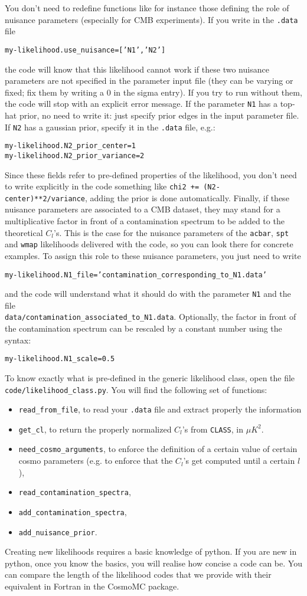 \documentclass[10pt]{article}
\newcommand{\CLASS}{\texttt{CLASS}}
\begin{document}
 You don't need to redefine functions like for instance those defining the role of nuisance parameters (especially for CMB experiments). 
 If you write in the \verb?.data? file
 \begin{alltt}
my-likelihood.use_nuisance           = ['N1','N2'] 
\end{alltt}
the code will know that this likelihood cannot work if these two nuisance parameters are not specified  in the parameter input file (they can be varying or fixed; fix them by writing a 0 in the sigma entry). If you try to run without them, the code will stop with an explicit error message.
If the parameter \verb?N1? has a top-hat prior, no need to write it: just specify prior edges in the input parameter file. If \verb?N2? has a gaussian prior, specify it in the \verb?.data? file, e.g.:
 \begin{alltt}
  my-likelihood.N2_prior_center  = 1
  my-likelihood.N2_prior_variance = 2  
\end{alltt}
Since these fields refer to pre-defined properties of the likelihood, you don't need to write explicitly in the code something like \verb?chi2 += (N2-center)**2/variance?, adding the prior is done automatically. Finally, if these nuisance parameters are associated to a CMB dataset, they may stand for a multiplicative factor in front of a contamination spectrum to be added to the theoretical $C_l$'s. This is the case for the nuisance parameters of the \verb?acbar?, \verb?spt? and \verb?wmap? likelihoods delivered with the code, so you can look there for concrete examples. To assign this role to these nuisance parameters, you just need to write
\begin{alltt}
  my-likelihood.N1_file = 'contamination_corresponding_to_N1.data'
\end{alltt}
and the code will understand what it should do with the parameter \verb?N1? and the file\\
\verb?data/contamination_associated_to_N1.data?. Optionally, the factor in front of the contamination spectrum can be rescaled by a constant number using the syntax:
\begin{alltt}
  my-likelihood.N1_scale = 0.5
\end{alltt}
To know exactly what is pre-defined in the generic likelihood class, open the file \verb?code/likelihood_class.py?. You will find the following set of functions:
  \begin{itemize}
    \item \verb?read_from_file?, to read your \verb?.data? file and extract
      properly the information
    \item \verb?get_cl?, to return the properly normalized $C_l$'s from \CLASS, in $\mu K^2$.
    \item \verb?need_cosmo_arguments?, to enforce the definition of a certain
      value of certain cosmo parameters (e.g. to enforce that the
      $C_l$'s get computed until a certain $l$),
    \item \verb?read_contamination_spectra?, 
    \item \verb?add_contamination_spectra?,
    \item \verb?add_nuisance_prior?.
  \end{itemize}

Creating new likelihoods requires a basic knowledge of python. If you are new in python, once you know the basics, you will realise how concise a code can be. You can compare the length of the likelihood codes that we provide with their equivalent in Fortran in the CosmoMC package.
\end{document}
